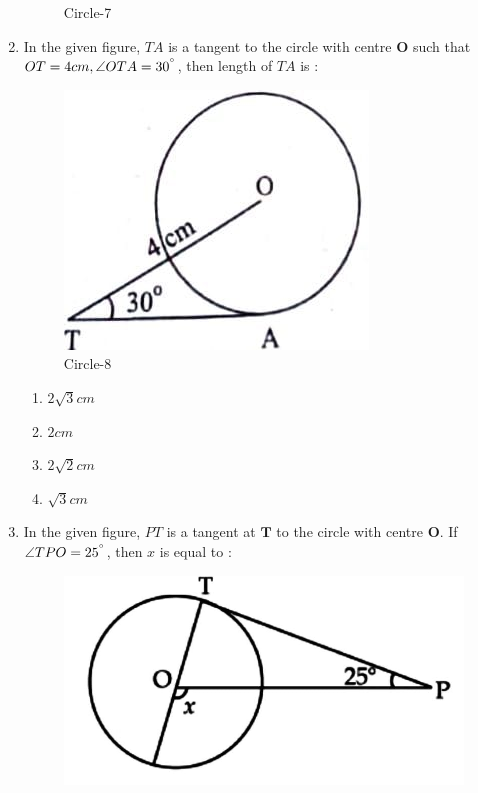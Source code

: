 \documentclass{article}
\let\vec\mathbf
\begin{document}
\begin{enumerate}
\begin{figure}[H]
			\caption{Circle-7}
			\label{fig:circle}
		\end{figure}
	\item In the given figure, $ TA $ is a tangent to the circle with centre $ \vec{O} $ such that $ OT = 4 cm , \angle{OTA} = 30^{\degree} $, then length of $ TA $ is :
		\begin{figure}[H]
			\centering
			\includegraphics[width=\columnwidth]{fig9.jpg}
			\caption{Circle-8}
			\label{fig:circle}
		\end{figure}
		\begin{enumerate}
			\item $ 2\sqrt{3} cm $
			\item $ 2 cm $
			\item $ 2\sqrt{2} cm $
			\item $ \sqrt{3} cm $
		\end{enumerate}
	\item In the given figure, $ PT $ is a tangent at $ \vec{T} $ to the circle with centre $ \vec{O} $. If $ \angle{TPO} = 25^{\degree} $, then $ x $ is equal to : 
		\begin{figure}[H]
			\centering
			\includegraphics[width=\columnwidth]{fig10.jpg}

\end{figure}
\end{enumerate}
\end{document}
